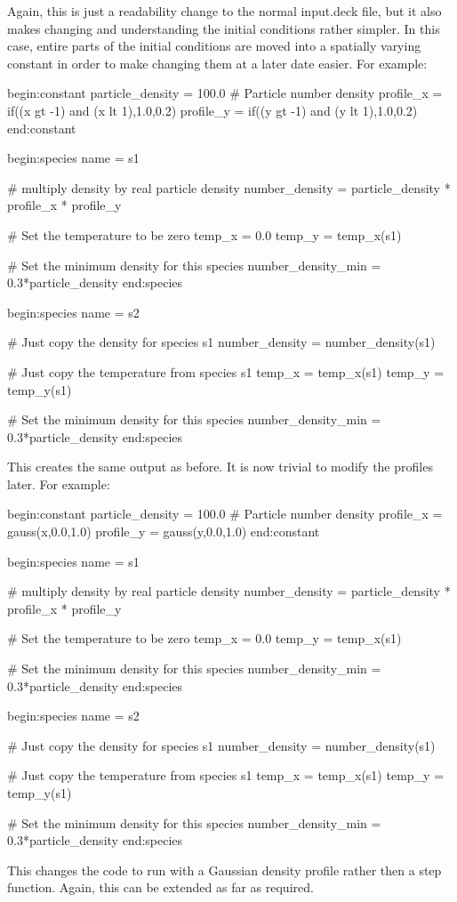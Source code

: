 Again, this is just a readability change to the normal input.deck file, but it
also makes changing and understanding the initial conditions rather
simpler. In this case, entire parts of the initial conditions are moved into a
spatially varying constant in order to make changing them at a later date
easier. For example:
\begin{boxverbatim}
begin:constant
   particle_density = 100.0 # Particle number density
   profile_x = if((x gt -1) and (x lt 1),1.0,0.2)
   profile_y = if((y gt -1) and (y lt 1),1.0,0.2)
end:constant

begin:species
   name = s1

   # multiply density by real particle density
   number_density = particle_density * profile_x * profile_y

   # Set the temperature to be zero
   temp_x = 0.0
   temp_y = temp_x(s1)

   # Set the minimum density for this species
   number_density_min = 0.3*particle_density
end:species

begin:species
   name = s2

   # Just copy the density for species s1
   number_density = number_density(s1)

   # Just copy the temperature from species s1
   temp_x = temp_x(s1)
   temp_y = temp_y(s1)

   # Set the minimum density for this species
   number_density_min = 0.3*particle_density
end:species
\end{boxverbatim}

This creates the same output as before. It is now trivial to modify the
profiles later. For example:
\begin{boxverbatim}
begin:constant
   particle_density = 100.0 # Particle number density
   profile_x = gauss(x,0.0,1.0)
   profile_y = gauss(y,0.0,1.0)
end:constant

begin:species
   name = s1

   # multiply density by real particle density
   number_density = particle_density * profile_x * profile_y

   # Set the temperature to be zero
   temp_x = 0.0
   temp_y = temp_x(s1)

   # Set the minimum density for this species
   number_density_min = 0.3*particle_density
end:species

begin:species
   name = s2

   # Just copy the density for species s1
   number_density = number_density(s1)

   # Just copy the temperature from species s1
   temp_x = temp_x(s1)
   temp_y = temp_y(s1)

   # Set the minimum density for this species
   number_density_min = 0.3*particle_density
end:species
\end{boxverbatim}

This changes the code to run with a Gaussian density profile rather then a step
function. Again, this can be extended as far as required.




